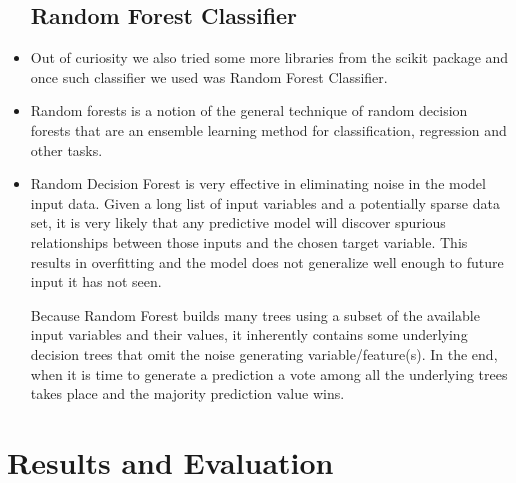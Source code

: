 \documentclass[letterpaper,twocolumn,11pt]{article}
\begin{document}
\begin{itemize}
\subsection{Random Forest Classifier}
\item Out of curiosity we also tried some more libraries from the scikit package and once such classifier we used was Random Forest Classifier.

\item Random forests is a notion of the general technique of random decision forests that are an ensemble learning method for classification, regression and other tasks.

\item Random Decision Forest is very effective in eliminating noise in the model input data.  Given a long list of input variables and a potentially sparse data set, it is very likely that any predictive model will discover spurious relationships between those inputs and the chosen target variable.  This results in overfitting and the model does not generalize well enough to future input it has not seen.

\subitem Because Random Forest builds many trees using a subset of the available input variables and their values, it inherently contains some underlying decision trees that omit the noise generating variable/feature(s).  In the end, when it is time to generate a prediction a vote among all the underlying trees takes place and the majority prediction value wins. 
\end{itemize}

\section{ Results and Evaluation}
\end{document}
